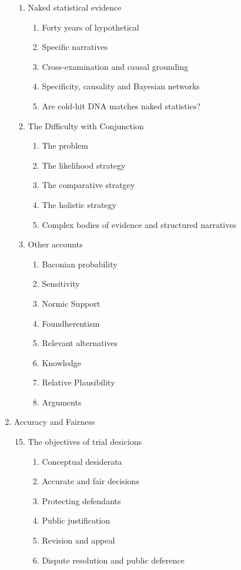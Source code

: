 \documentclass[
  10pt,
  dvipsnames,enabledeprecatedfontcommands]{scrartcl}
\begin{document}
\begin{enumerate}
\begin{enumerate}
\item  Naked statistical evidence
  \begin{enumerate}
  \item  Forty years of hypothetical
  \item  Specific narratives
  \item  Cross-examination and causal grounding
  \item  Specificity, causality and Bayesian networks 
  \item  Are cold-hit DNA matches naked statistics?
  \end{enumerate}
  
  
\item  The Difficulty with Conjunction
  \begin{enumerate}
  \item  The problem
  \item  The likelihood strategy
  \item  The comparative stratgey
  \item  The holistic strategy
  \item  Complex bodies of evidence and structured narratives
  \end{enumerate}  

 \item  Other accounts 
  \begin{enumerate}
  \item  Baconian probability
  \item  Sensitivity
  \item  Normic Support
  \item  Foundherentism
  \item  Relevant alternatives
  \item  Knowledge
  \item  Relative Plausibility
  \item  Arguments
  \end{enumerate}

\end{enumerate}
\item  Accuracy and Fairness
\begin{enumerate}

\setcounter{enumii}{14}
  \item  The objectives of trial desicions
  \begin{enumerate}
  \item  Conceptual desiderata
  \item  Accurate and fair decisions
  \item  Protecting defendants
  \item  Public justification 
  \item  Revision and appeal
  \item  Dispute resolution and public deference
  \end{enumerate}





\end{enumerate}
\end{enumerate}
\end{document}
